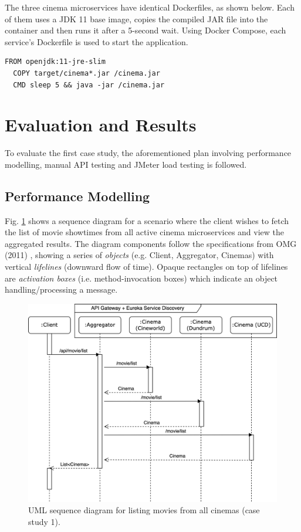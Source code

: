 The three cinema microservices have identical Dockerfiles, as shown below. Each of them uses a JDK 11 base image, copies the compiled JAR file into the container and then runs it after a 5-second wait. Using Docker Compose, each service's Dockerfile is used to start the application.

\begin{lstlisting}[caption=Dockerfile for cinema services.]
  FROM openjdk:11-jre-slim
  COPY target/cinema*.jar /cinema.jar
  CMD sleep 5 && java -jar /cinema.jar
\end{lstlisting}


\section{Evaluation and Results}

To evaluate the first case study, the aforementioned plan involving performance modelling, manual API testing and JMeter load testing is followed.

\subsection{Performance Modelling}

Fig. \ref{fig:cs01-sequence} shows a sequence diagram for a scenario where the client wishes to fetch the list of movie showtimes from all active cinema microservices and view the aggregated results. The diagram components follow the specifications from OMG (2011) \cite{omg11}, showing a series of \textit{objects} (e.g. Client, Aggregator, Cinemas) with vertical \textit{lifelines} (downward flow of time). Opaque rectangles on top of lifelines are \textit{activation boxes} (i.e. method-invocation boxes) which indicate an object handling/processing a message.

\begin{figure}[H]
  \centering
  \includegraphics[width=0.75\linewidth]{./assets/diagrams/cs01-sequence.png}
  \caption{UML sequence diagram for listing movies from all cinemas (case study 1).}
  \label{fig:cs01-sequence}
\end{figure}

